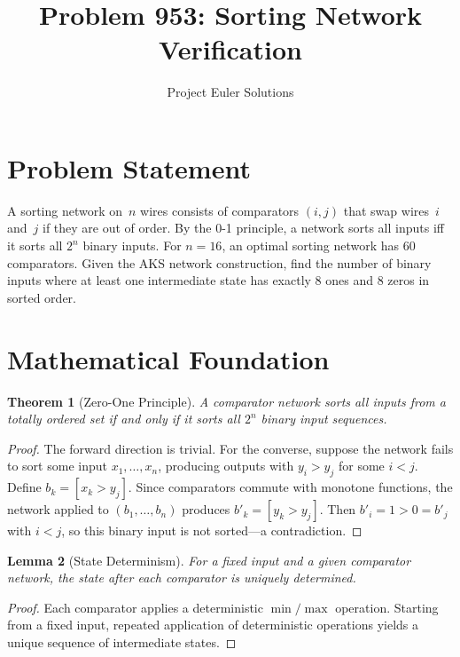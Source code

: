 \documentclass[11pt]{article}
\title{Problem 953: Sorting Network Verification}
\author{Project Euler Solutions}
\date{}
\newtheorem{theorem}{Theorem}
\newtheorem{lemma}[theorem]{Lemma}
\begin{document}
\maketitle

\section{Problem Statement}

A sorting network on~$n$ wires consists of comparators $(i,j)$ that swap wires~$i$ and~$j$ if they are out of order. By the 0-1 principle, a network sorts all inputs iff it sorts all $2^n$ binary inputs. For $n=16$, an optimal sorting network has 60 comparators. Given the AKS network construction, find the number of binary inputs where at least one intermediate state has exactly 8 ones and 8 zeros in sorted order.

\section{Mathematical Foundation}

\begin{theorem}[Zero-One Principle]
A comparator network sorts all inputs from a totally ordered set if and only if it sorts all $2^n$ binary input sequences.
\end{theorem}

\begin{proof}
The forward direction is trivial. For the converse, suppose the network fails to sort some input $x_1, \ldots, x_n$, producing outputs with $y_i > y_j$ for some $i < j$. Define $b_k = [x_k > y_j]$. Since comparators commute with monotone functions, the network applied to $(b_1, \ldots, b_n)$ produces $b'_k = [y_k > y_j]$. Then $b'_i = 1 > 0 = b'_j$ with $i < j$, so this binary input is not sorted---a contradiction.
\end{proof}

\begin{lemma}[State Determinism]
For a fixed input and a given comparator network, the state after each comparator is uniquely determined.
\end{lemma}

\begin{proof}
Each comparator applies a deterministic $\min/\max$ operation. Starting from a fixed input, repeated application of deterministic operations yields a unique sequence of intermediate states.
\end{proof}
\end{document}

